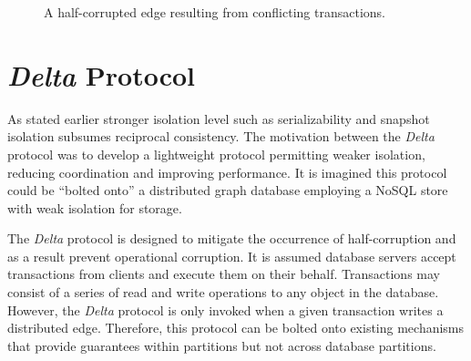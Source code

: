 \documentclass[sigplan,10pt]{acmart}
\begin{document}
\begin{figure}[ht]
  \centering
  \caption{A half-corrupted edge resulting from conflicting transactions.}
  \label{half-corrupted}
\end{figure}

\section{\emph{Delta} Protocol}

As stated earlier stronger isolation level such as serializability and snapshot isolation subsumes reciprocal consistency. The motivation between the \emph{Delta} protocol was to develop a lightweight protocol permitting weaker isolation, reducing coordination and improving performance. It is imagined this protocol could be ``bolted onto'' a distributed graph database employing a NoSQL store with weak isolation for storage.

The \emph{Delta} protocol is designed to mitigate the occurrence of half-corruption and as a result prevent operational corruption. It is assumed database servers accept transactions from clients and execute them on their behalf. Transactions may consist of a series of read and write operations to any object in the database. However, the \emph{Delta} protocol is only invoked when a given transaction writes a distributed edge. Therefore, this protocol can be bolted onto existing mechanisms that provide guarantees within partitions but not across database partitions.
\end{document}
